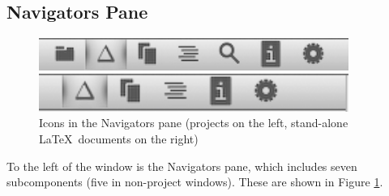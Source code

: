 \subsection{Navigators Pane}
\begin{figure}[htbp]
\begin{minipage}{0.5\textwidth}
\begin{flushleft}
\includegraphics[width=0.9\textwidth]{TeXnicle-Images/texnicle-navproj.png}
\end{flushleft}
\end{minipage}
\begin{minipage}{0.5\textwidth}
\begin{flushright}
\includegraphics[width=0.9\textwidth]{TeXnicle-Images/texnicle-navalone.png}
\end{flushright}
\end{minipage}
\caption{Icons in the Navigators pane (projects on the left, stand-alone \LaTeX\ documents on the right)}
\label{fig:texnicle-navigatorbars}
 \end{figure}
To the left of the window is the Navigators pane, which includes seven subcomponents (five in non-project windows). These are shown in Figure \ref{fig:texnicle-navigatorbars}.

